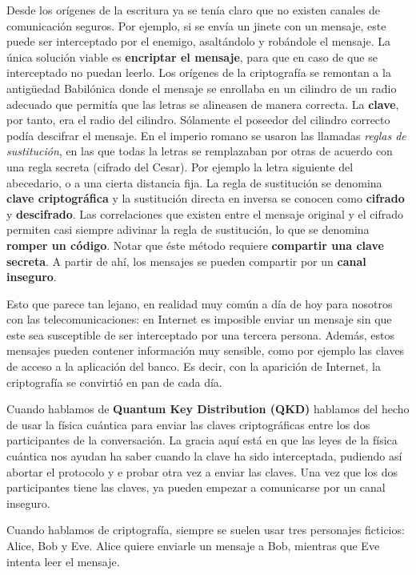 \documentclass[a4paper,11pt]{book} %
\numberwithin{equation}{chapter}
\begin{document}
Desde los orígenes de la escritura ya se tenía claro que no existen canales de comunicación seguros. Por ejemplo, si se envía un jinete con un mensaje, este puede ser interceptado por el enemigo, asaltándolo y robándole el mensaje. La única solución viable es \textbf{encriptar el mensaje}, para que en caso de que se  interceptado no puedan leerlo. 
Los orígenes de la criptografía se remontan a la antigüedad Babilónica donde el mensaje se enrollaba
en un cilindro de un radio adecuado que permitía que las letras se alineasen de manera correcta. La
\textbf{clave}, por tanto, era el radio del cilindro. Sólamente el poseedor del cilindro correcto podía descifrar el
mensaje. En el imperio romano se usaron las llamadas \textit{reglas de sustitución}, en las que todas la letras se
remplazaban por otras de acuerdo con una regla secreta (cifrado del Cesar). Por ejemplo la letra siguiente
del abecedario, o a una cierta distancia fija. La regla de sustitución se denomina \textbf{clave criptográfica} y la
sustitución directa en inversa se conocen como \textbf{cifrado} y \textbf{descifrado}. Las correlaciones que existen entre el
mensaje original y el cifrado permiten casi siempre adivinar la regla de sustitución, lo que se denomina
\textbf{romper un código}. Notar que éste método requiere \textbf{compartir una clave secreta}. A partir de ahí, los
mensajes se pueden compartir por un \textbf{canal inseguro}. 

Esto que parece tan lejano, en realidad muy común a día de hoy para nosotros con las telecomunicaciones: en Internet es imposible enviar un mensaje sin que este sea susceptible de ser interceptado por una tercera persona. Además, estos mensajes pueden contener información muy sensible, como por ejemplo las claves de acceso a la aplicación del banco. Es decir, con la aparición de Internet, la criptografía se convirtió en pan de cada día. 

Cuando hablamos de \textbf{Quantum Key Distribution (QKD)} hablamos del hecho de usar la física cuántica para enviar las claves criptográficas entre los dos participantes de la conversación. La gracia aquí está en que las leyes de la física cuántica nos ayudan ha saber cuando la clave ha sido interceptada, pudiendo así abortar el protocolo y e probar otra vez a enviar las claves. Una vez que los dos participantes tiene las claves, ya pueden empezar a comunicarse por un canal inseguro.

Cuando hablamos de criptografía, siempre se suelen usar tres personajes ficticios: Alice, Bob y Eve. Alice quiere enviarle un mensaje a Bob, mientras que Eve intenta leer el mensaje. 
\end{document}
